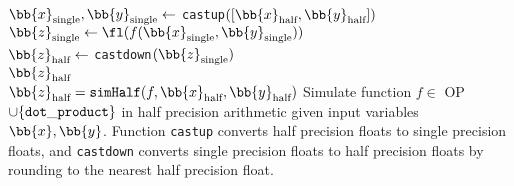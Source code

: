 \begin{algorithm2e}[H]
	\DontPrintSemicolon %
	$\bb{x}_{\text{single}}, \bb{y}_{\text{single}} \gets$ {\tt castup}$([\bb{x}_{\text{half}},\bb{y}_{\text{half}}])$\\
	$\bb{z}_{\text{single}} \gets \fl(f(\bb{x}_{\text{single}}, \bb{y}_{\text{single}}))$\\
	$\bb{z}_{\text{half}} \gets$ {\tt castdown}$(\bb{z}_{\text{single}})$\\
	\Return $\bb{z}_{\text{half}}$\\
	\caption{$\bb{z}_{\text{half}} = {\tt simHalf}(f, \bb{x}_{\text{half}}, \bb{y}_{\text{half}})$ Simulate function $f\in$ OP$\cup \{{\tt dot\_product} \}$ in half precision arithmetic given input variables $\bb{x},\bb{y}$. Function {\tt castup} converts half precision floats to single precision floats, and {\tt castdown} converts single precision floats to half precision floats by rounding to the nearest half precision float.}
	\label{algo:simulate}
\end{algorithm2e}

